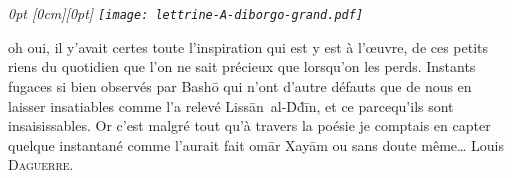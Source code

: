 



\section*{}
\thispagestyle{empty}
{\em\small
{}
0pt \textwidth
0pt                \textwidth
\noindent{}\raisebox{-\height+0.565cm}[0cm][0pt]{
\hspace{-1.7cm}\texttt{[image: lettrine-A-diborgo-grand.pdf]}}%
 oh oui, il y’avait certes toute l’inspiration qui est y est à l’œuvre, de ces petits riens du quotidien que l’on ne sait précieux que lorsqu’on les perds. Instants fugaces si bien observés par Bashō qui n’ont d’autre défauts que de nous en laisser insatiables comme l’a relevé Lissān~al-Ḋḋīn, et ce parcequ’ils sont insaisissables. Or c’est malgré tout  qu’à travers la poésie je comptais en capter quelque instantané comme l’aurait fait omār Xayām ou sans doute même… Louis \textsc{Daguerre}.


}
